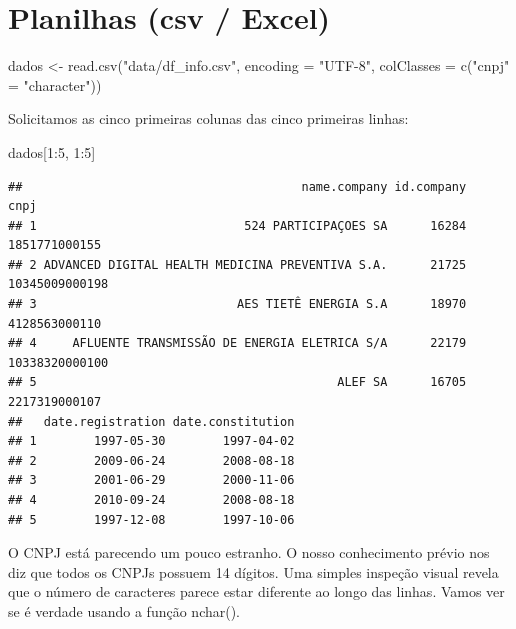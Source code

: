 \documentclass[
]{book}
\newenvironment{Shaded}{\begin{snugshade}}{\end{snugshade}}
\newcommand{\AttributeTok}[1]{\textcolor[rgb]{0.77,0.63,0.00}{#1}}
\newcommand{\DecValTok}[1]{\textcolor[rgb]{0.00,0.00,0.81}{#1}}
\newcommand{\FunctionTok}[1]{\textcolor[rgb]{0.00,0.00,0.00}{#1}}
\newcommand{\NormalTok}[1]{#1}
\newcommand{\OtherTok}[1]{\textcolor[rgb]{0.56,0.35,0.01}{#1}}
\newcommand{\SpecialCharTok}[1]{\textcolor[rgb]{0.00,0.00,0.00}{#1}}
\newcommand{\StringTok}[1]{\textcolor[rgb]{0.31,0.60,0.02}{#1}}
\begin{document}
\hypertarget{planilhas-csv-excel}{%
\section{Planilhas (csv / Excel)}\label{planilhas-csv-excel}}

\begin{Shaded}
\begin{Highlighting}[]
\NormalTok{dados }\OtherTok{\textless{}{-}} \FunctionTok{read.csv}\NormalTok{(}\StringTok{"data/df\_info.csv"}\NormalTok{, }\AttributeTok{encoding =} \StringTok{"UTF{-}8"}\NormalTok{, }\AttributeTok{colClasses =} \FunctionTok{c}\NormalTok{(}\StringTok{"cnpj"} \OtherTok{=} \StringTok{"character"}\NormalTok{))}
\end{Highlighting}
\end{Shaded}

Solicitamos as cinco primeiras colunas das cinco primeiras linhas:

\begin{Shaded}
\begin{Highlighting}[]
\NormalTok{dados[}\DecValTok{1}\SpecialCharTok{:}\DecValTok{5}\NormalTok{, }\DecValTok{1}\SpecialCharTok{:}\DecValTok{5}\NormalTok{]}
\end{Highlighting}
\end{Shaded}

\begin{verbatim}
##                                       name.company id.company           cnpj
## 1                             524 PARTICIPAÇOES SA      16284  1851771000155
## 2 ADVANCED DIGITAL HEALTH MEDICINA PREVENTIVA S.A.      21725 10345009000198
## 3                            AES TIETÊ ENERGIA S.A      18970  4128563000110
## 4     AFLUENTE TRANSMISSÃO DE ENERGIA ELETRICA S/A      22179 10338320000100
## 5                                          ALEF SA      16705  2217319000107
##   date.registration date.constitution
## 1        1997-05-30        1997-04-02
## 2        2009-06-24        2008-08-18
## 3        2001-06-29        2000-11-06
## 4        2010-09-24        2008-08-18
## 5        1997-12-08        1997-10-06
\end{verbatim}

O CNPJ está parecendo um pouco estranho. O nosso conhecimento prévio nos diz que todos os CNPJs possuem 14 dígitos. Uma simples inspeção visual revela que o número de caracteres parece estar diferente ao longo das linhas. Vamos ver se é verdade usando a função nchar().

\begin{Shaded}
\end{Shaded}
\end{document}
